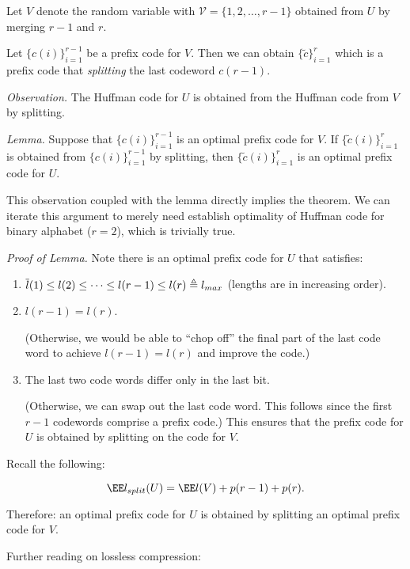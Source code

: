 \def\VV{\mathcal{V}}

Let $V$ denote the random variable with $\VV = \{1, 2, \dots, r-1 \}$ obtained from $U$ by merging $r-1$ and $r$.

\def\ct{\tilde{c}}

Let $\{ c(i) \}_{i=1}^{r-1}$ be a prefix code for $V$.  Then we can obtain $\{\ct\}_{i=1}^{r}$ which is a prefix code that \textit{splitting} the last codeword $c(r-1)$.  

{\it Observation.} The Huffman code for $U$ is obtained from the Huffman code from $V$ by splitting.

{\it Lemma.} Suppose that $\{ c(i) \}_{i=1}^{r-1}$ is an optimal prefix code for $V$.  If $\{ \ct(i) \}_{i=1}^{r}$ is obtained from $\{ c(i) \}_{i=1}^{r-1}$ by splitting, then $\{ \ct(i) \}_{i=1}^{r}$ is an optimal prefix code for $U$.

This observation coupled with the lemma directly implies the theorem.  We can iterate this argument to merely need establish optimality of Huffman code for binary alphabet ($r=2$), which is trivially true.

\def\ep{\hfill \blacksquare}
\def\dq{\triangleq}
{\it Proof of Lemma.}  Note there is an optimal prefix code for $U$ that satisfies:

\def\lt{\tidle{l}}
\begin{enumerate}
  \item $\l(1) \leq l(2) \leq \dots \leq l(r-1) \leq l(r) \dq l_{max}$ (lengths are in increasing order).
  \item $l(r-1) = l(r)$.  
    
    (Otherwise, we would be able to ``chop off'' the final part of the last code word to achieve $l(r-1) = l(r)$ and improve the code.)
  \item The last two code words differ only in the last bit.
    
    (Otherwise, we can swap out the last code word.  This follows since the first $r-1$ codewords comprise a prefix code.)  This ensures that the prefix code for $U$ is obtained by splitting on the code for $V$. 
\end{enumerate}


Recall the following:

\[
  \EE l_{split} (U) = \EE l(V) + p(r-1) + p(r).
\]

Therefore: an optimal prefix code for $U$ is obtained by splitting an optimal prefix code for $V$. \ep

Further reading on lossless compression: 

